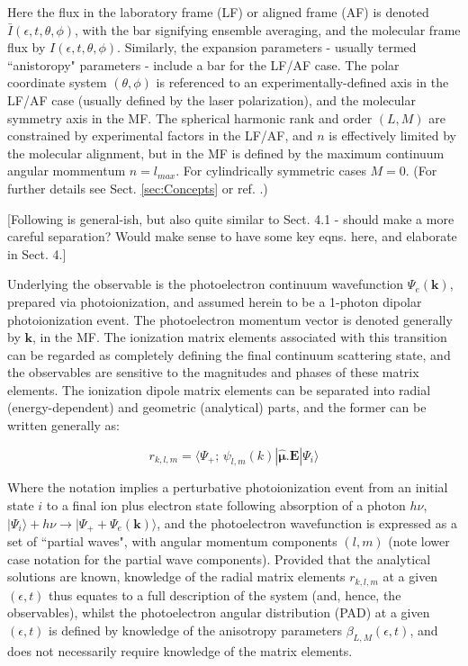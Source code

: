 Here the flux in the laboratory frame (LF) or aligned frame (AF) is denoted $\bar{I}(\epsilon,t,\theta,\phi)$, with the bar signifying ensemble averaging, and the molecular frame flux by $I(\epsilon,t,\theta,\phi)$. Similarly, the expansion parameters - usually termed ``anistoropy" parameters - include a bar for the LF/AF case. The polar coordinate system $(\theta,\phi)$ is referenced to an experimentally-defined axis in the LF/AF case (usually defined by the laser polarization), and the molecular symmetry axis in the MF. The spherical harmonic rank and order $(L,M)$ are constrained by experimental factors in the LF/AF, and $n$ is effectively limited by the molecular alignment, but in the MF is defined by the maximum continuum angular mommentum $n=l_{max}$. For cylindrically symmetric cases $M=0$. (For further details see Sect. \ref{sec:Concepts} or ref. \cite{hockett2018QMP1}.)

[Following is general-ish, but also quite similar to Sect. 4.1 - should make a more careful separation? Would make sense to have some key eqns. here, and elaborate in Sect. 4.]

Underlying the observable is the photoelectron continuum wavefunction $\Psi_{e}(\boldsymbol{\mathbf{k}})$, prepared via photoionization, and assumed herein to be a 1-photon dipolar photoionization event. The photoelectron momentum vector is denoted generally by $\boldsymbol{\mathbf{k}}$, in the MF. %
The ionization matrix elements associated with this transition can be regarded as completely defining the final continuum scattering state, and the observables are sensitive to the magnitudes and phases of these matrix elements. The ionization dipole matrix elements can be separated into radial (energy-dependent) and geometric (analytical) parts, and the former can be written generally as:

\begin{equation}
r_{k,l,m}=\langle\Psi_{+};\,\psi_{l,m}(k)|\hat{\mathbf{\mu}}.\boldsymbol{\mathbf{E}}|\Psi_{i}\rangle\label{eq:r-kllam}
\end{equation}

Where the notation implies a perturbative photoionization event from an initial state $i$ to a final ion plus electron state following absorption of a photon $h\nu$, %
$|\Psi_{i}\rangle+h\nu{\rightarrow}|\Psi_{+}+\Psi_{e}(\boldsymbol{\mathbf{k}})\rangle$, and the photoelectron wavefunction is expressed as a set of ``partial waves", with angular momentum components $(l,m)$ (note lower case notation for the partial wave components). Provided that the analytical solutions are known, knowledge of the radial matrix elements $r_{k,l,m}$ at a given $(\epsilon,t)$ thus equates to a full description of the system (and, hence, the observables), whilst the photoelectron angular distribution (PAD) at a given $(\epsilon,t)$ is defined by knowledge of the anisotropy parameters $\beta_{L,M}(\epsilon,t)$, and does not necessarily require knowledge of the matrix elements.

